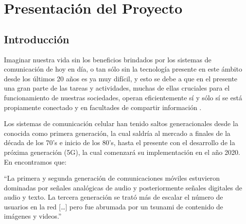 
\chapter{Presentación del Proyecto} %

\label{Chapter1} %


\newcommand{\keyword}[1]{\textbf{#1}}
\newcommand{\tabhead}[1]{\textbf{#1}}
\newcommand{\code}[1]{\texttt{#1}}
\newcommand{\file}[1]{\texttt{\bfseries#1}}
\newcommand{\option}[1]{\texttt{\itshape#1}}


\section{Introducción}

Imaginar nuestra vida sin los beneficios brindados por los sistemas de comunicación de hoy en día, o tan sólo sin la tecnología presente en este ámbito desde los últimos 20 años es ya muy difícil, y esto se debe a que en el presente una gran parte de las tareas y actividades, muchas de ellas cruciales para el funcionamiento de nuestras sociedades, operan eficientemente sí y sólo sí se está propiamente conectado y en facultades de compartir información \parencite{Fettweis2014}.\newline

Los sistemas de comunicación celular han tenido saltos generacionales desde la conocida como primera generación, la cual saldría al mercado a finales de la década de los 70’s e inicio de los 80’s, hasta el presente con el desarrollo de la próxima generación (5G), la cual comenzará su implementación en el año 2020. En \parencite{Fettweis2014} encontramos que:\newline

\hspace*{10mm} {“La primera y segunda generación de comunicaciones móviles estuvieron dominadas por señales analógicas de audio y posteriormente señales digitales de audio y texto. La tercera generación se trató más de escalar el número de usuarios en la red […] pero fue abrumada por un tsunami de contenido de imágenes y videos.”}\newline

